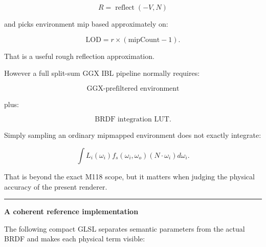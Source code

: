 \[
R=\operatorname{reflect}(-V,N)
\]

and picks environment mip based approximately on:

\[
\text{LOD}
=
r\times(\text{mipCount}-1).
\]

That is a useful rough reflection approximation.

However a full split-sum GGX IBL pipeline normally requires:

\[
\text{GGX-prefiltered environment}
\]

plus:

\[
\text{BRDF integration LUT}.
\]

Simply sampling an ordinary mipmapped environment does not exactly integrate:

\[
\int
L_i(\omega_i)
f_s(\omega_i,\omega_o)
(N\cdot\omega_i)
d\omega_i.
\]

That is beyond the exact M118 scope, but it matters when judging the physical accuracy of the present renderer.

\begin{center}\rule{0.5\linewidth}{0.5pt}\end{center}

\textbf{A coherent reference implementation}

The following compact GLSL separates semantic parameters from the actual BRDF and makes each physical term visible:

